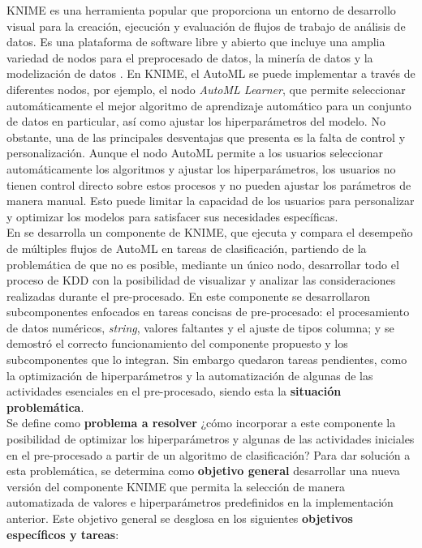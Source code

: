 KNIME es una herramienta popular que proporciona un entorno de desarrollo visual para la creación, ejecución y evaluación de flujos de trabajo de análisis de datos. Es una plataforma de software libre y abierto que incluye una amplia variedad de nodos para el preprocesado de datos, la minería de datos y la modelización de datos \citep{KNIME2023}. En KNIME, el AutoML se puede implementar a través de diferentes nodos, por ejemplo, el nodo \textit{AutoML Learner}, que permite seleccionar automáticamente el mejor algoritmo de aprendizaje automático para un conjunto de datos en particular, así como ajustar los hiperparámetros del modelo. No obstante, una de las principales desventajas que presenta es la falta de control y personalización. Aunque el nodo AutoML permite a los usuarios seleccionar automáticamente los algoritmos y ajustar los hiperparámetros, los usuarios no tienen control directo sobre estos procesos y no pueden ajustar los parámetros de manera manual. Esto puede limitar la capacidad de los usuarios para personalizar y optimizar los modelos para satisfacer sus necesidades específicas. \\
En \citep{Carrazana2022} se desarrolla un componente de KNIME, que ejecuta y compara el desempeño de múltiples flujos de AutoML en tareas de clasificación, partiendo de la problemática de que no es posible, mediante un único nodo, desarrollar todo el proceso de KDD con la posibilidad de visualizar y analizar las consideraciones realizadas durante el pre-procesado. En este componente se desarrollaron subcomponentes enfocados en tareas concisas de pre-procesado: el procesamiento de datos numéricos, \textit{string}, valores faltantes y el ajuste de tipos columna; y se demostró el correcto funcionamiento del componente propuesto y los subcomponentes que lo integran. Sin embargo quedaron tareas pendientes, como la optimización de hiperparámetros y la automatización de algunas de las actividades esenciales en el pre-procesado, siendo esta la \textbf{situación problemática}. \\
Se define como \textbf{problema a resolver} ¿cómo incorporar a este componente la posibilidad de optimizar los hiperparámetros y algunas de las actividades iniciales en el pre-procesado a partir de un algoritmo de clasificación? Para dar solución a esta problemática, se determina como \textbf{objetivo general} desarrollar una nueva versión del componente KNIME que permita la selección de manera automatizada de valores e hiperparámetros predefinidos en la implementación anterior. Este objetivo general se desglosa en los siguientes \textbf{objetivos específicos y tareas}:

